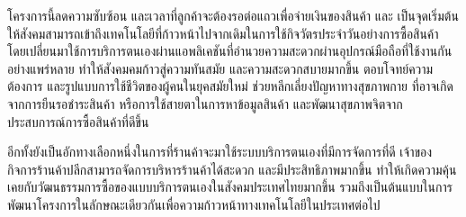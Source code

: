 \par โครงการนี้ลดความซับซ้อน และเวลาที่ลูกค้าจะต้องรอต่อแถวเพื่อจ่ายเงินของสินค้า
และ เป็นจุดเริ่มต้นให้สังคมสามารถเข้าถึงเทคโนโลยีที่ก้าวหน้าไปจากเดิมในการใช้กิจวัตรประจำวันอย่างการซื้อสินค้า
โดยเปลี่ยนมาใช้การบริการตนเองผ่านแอพลิเคชันที่อำนวยความสะดวกผ่านอุปกรณ์มือถือที่ใช้งานกันอย่างแพร่หลาย
ทำให้สังคมคมก้าวสู่ความทันสมัย และความสะดวกสบายมากขึ้น ตอบโจทย์ความต้องการ และรูปแบบการใช้ชีวิตของผู้คนในยุคสมัยใหม่
ช่วยหลีกเลี่ยงปัญหาทางสุขภาพกาย ที่อาจเกิดจากการยืนรอชำระสินค้า หรือการใช้สายตาในการหาข้อมูลสินค้า
และพัฒนาสุขภาพจิตจากประสบการณ์การซื้อสินค้าที่ดีขึ้น
\par อีกทั้งยังเป็นอักทางเลือกหนึ่งในการที่ร้านค้าจะมาใช้ระบบบริการตนเองที่มีการจัดการที่ดี
เจ้าของกิจการร้านค้าปลีกสามารถจัดการบริหารร้านค้าได้สะดวก
และมีประสิทธิภาพมากขึ้น ทำให้เกิดความคุ้นเคยกับวัฒนธรรมการซื้อของแบบบริการตนเองในสังคมประเทศไทยมากขึ้น
รวมถึงเป็นต้นแบบในการพัฒนาโครงการในลักษณะเดียวกันเพื่อความก้าวหน้าทางเทคโนโลยีในประเทศต่อไป